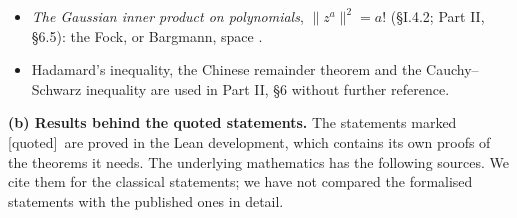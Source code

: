 \documentclass[11pt,letterpaper]{article}
\newcommand{\quoted}{\textsf{[quoted]}}
\begin{document}
\begin{itemize}
{with complex multiplication}, which explain the exponent $a\,p/(p^2-1)$ at inert primes: Lubin and Tate
\cite{LT65}, Honda \cite{Hon70}. That the reduction is of this type exactly at the inert primes: Deuring
\cite{Deu41}. Algebraicity of the lattice sums of \S I.4.1: compare Damerell \cite{Dam70}.
\item \emph{The Gaussian inner product on polynomials}, $\|z^a\|^2=a!$ (\S I.4.2; Part II, \S6.5): the
Fock, or Bargmann, space \cite{Bar61}.
\item Hadamard's inequality, the Chinese remainder theorem and the Cauchy--Schwarz inequality are used in
Part II, \S6 without further reference.
\end{itemize}

\textbf{(b) Results behind the quoted statements.} The statements marked \quoted\ are proved in the Lean
development, which contains its own proofs of the theorems it needs. The underlying mathematics has the
following sources. We cite them for the classical statements; we have not compared the formalised
statements with the published ones in detail.
\end{document}

